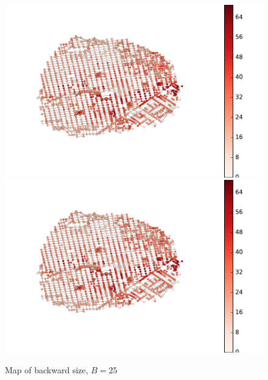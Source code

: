 \begin{figure} \caption{Map of backward size, $B=25$}\label{fig:SF_hub_size_map}
\begin{center}
\includegraphics[clip, trim=1.7cm 2.2cm 4.7cm 1.7cm,scale=0.8]{TexImg/SF_hub_sizes.pdf}
\includegraphics[clip, trim=13cm 0cm 1.1cm 0cm,scale=0.45]{TexImg/SF_hub_sizes.pdf}
\end{center}
\end{figure}

